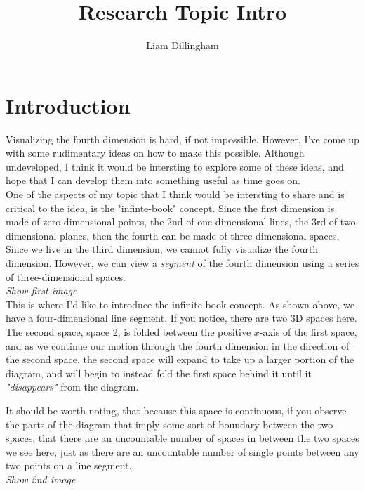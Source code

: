 \documentclass[20pt]{article} %
\title{Research Topic Intro}
\author{Liam Dillingham}
\begin{document}
\maketitle

\section{Introduction}
Visualizing the fourth dimension is hard, if not impossible.  However, I've come up with some rudimentary ideas on how to make this possible.  Although undeveloped, I think it would be intersting to explore some of these ideas, and hope that I can develop them into something useful as time goes on. \\ 

One of the aspects of my topic that I think would be intersting to share and is critical to the idea, is the "infinte-book" concept.  Since the first dimension is made of zero-dimensional points, the $2$nd of one-dimensional lines, the $3$rd of two-dimensional planes, then the fourth can be made of three-dimensional spaces.  Since we live in the third dimension, we cannot fully visualize the fourth dimension. However, we can view a \textit{segment} of the fourth dimension using a series of three-dimensional spaces. \\

\textit{ Show first image} \\ 

This is where I'd like to introduce the infinite-book concept.  As shown above, we have a four-dimensional line segment. If you notice, there are two 3D spaces here.  
The second space, space 2, is folded between the positive $x$-axis of the first space, and as we continue our motion through the fourth dimension in the direction of the second space, the second space will expand to take up a larger portion of the diagram, and will begin to instead fold the first space behind it until it \textit{"disappears"} from the diagram.

It should be worth noting, that because this space is continuous, if you observe the parts of the diagram that imply some sort of boundary between the two spaces, that there are an uncountable number of spaces in between the two spaces we see here, just as there are an uncountable number of single points between any two points on a line segment. \\ 

\textit{ Show 2nd image} \\ 
\end{document}
